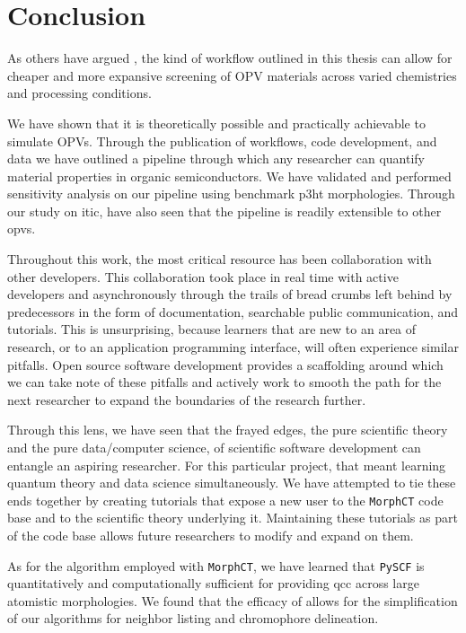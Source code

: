 \chapter{Conclusion}
\label{conclusion}

As others have argued \cite{Evans2016}\cite{Gali2017}\cite{Jones2017}, the kind of workflow outlined in this thesis
can allow for cheaper and more expansive screening of OPV materials across varied chemistries and processing
conditions. 

We have shown that it is theoretically possible and practically
achievable to simulate OPVs. 
Through the publication
of workflows, code development, and data we have outlined a 
pipeline through which any researcher can quantify material properties in
organic semiconductors. We have validated and performed sensitivity analysis on our pipeline using benchmark
\gls{p3ht} morphologies. Through our study on \gls{itic},  have also seen that the pipeline is readily
extensible to other \gls{opvs}.

Throughout this work, the most critical resource has been collaboration with
other developers. This collaboration took place in real time with active
developers and asynchronously through the trails of bread crumbs left behind
by predecessors in the form of documentation, searchable public communication,
and tutorials. This is unsurprising, because learners that are new to an area
of research, or to an application programming interface, will often experience
similar pitfalls. Open source software development provides a scaffolding
around which we can take note of these pitfalls and actively work to smooth the 
path for the next
researcher to expand the boundaries of the research further.

Through this lens, we have seen that the frayed edges, the pure
scientific theory and the pure data/computer science, of scientific software
development can entangle an aspiring researcher. For this particular project,
that meant learning quantum theory and data science simultaneously. We have
attempted to tie these ends together by creating tutorials that expose a new
user to the \texttt{MorphCT} code base and to the scientific theory
underlying it. Maintaining these tutorials as part of the code base allows
future researchers to modify and expand on them. 

As for the algorithm employed with \texttt{MorphCT}, we have learned that
\texttt{PySCF} is quantitatively and computationally sufficient for providing
\gls{qcc} across large atomistic morphologies. We found that the efficacy of
 allows for the simplification of our algorithms for neighbor
listing and chromophore delineation.  





